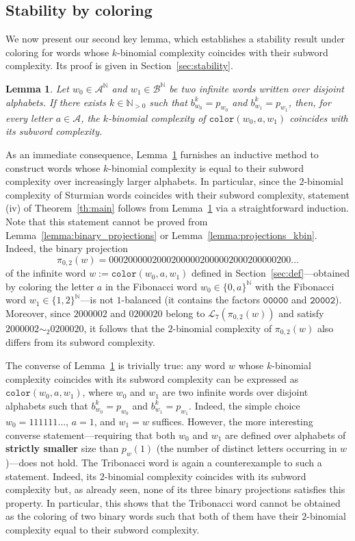 \documentclass{template_arxiv}
\newtheorem{lemma}{Lemma}%
\theoremstyle{definition}
\newcommand{\N}{\mathbb{N}}
\newcommand{\A}{\mathcal{A}}
\newcommand{\B}{\mathcal{B}}
\newcommand{\lan}{\mathcal{L}}
\newcommand{\colour}{\mathtt{color}}
\begin{document}
\subsection{Stability by coloring}

We now present our second key lemma, which establishes a stability result under coloring for words whose $k$-binomial complexity coincides with their subword complexity. Its proof is given in Section~\ref{sec:stability}.

\begin{lemma}\label{lemma:stability}
Let $w_0\in\A^\N$ and $w_1\in\B^\N$ be two infinite words written over disjoint alphabets. If there exists $k\in\N_{>0}$ such that $b_{w_0}^k=p_{w_0}$ and $b_{w_1}^k=p_{w_1}$, then, for every letter $a\in\A$, the $k$-binomial complexity of $\colour(w_0,a,w_1)$ coincides with its subword complexity.
\end{lemma}

As an immediate consequence, Lemma~\ref{lemma:stability} furnishes an inductive method to construct words whose $k$-binomial complexity is equal to their subword complexity over increasingly larger alphabets. In particular, since the $2$-binomial complexity of Sturmian words coincides with their subword complexity, statement (iv) of Theorem~\ref{th:main} follows from Lemma~\ref{lemma:stability} via a straightforward induction. Note that this statement cannot be proved from Lemma~\ref{lemma:binary_projections} or Lemma~\ref{lemma:projections_kbin}. Indeed, the binary projection
\[
	\pi_{0,2}(w)=00 02 00 00 02 00 02 00 00 02 00 00 02 00 02 00 00 02 00\ldots
\]
of the infinite word $w:=\colour(w_0,a,w_1)$ defined in Section~\ref{sec:def}---obtained by coloring the letter $a$ in the Fibonacci word $w_0\in\{0,a\}^\N$ with the Fibonacci word $w_1\in\{1,2\}^\N$---is not $1$-balanced (it contains the factors $\mathtt{00000}$ and $\mathtt{20002}$). Moreover, since $2000002$ and $0200020$ belong to $\lan_7(\pi_{0,2}(w))$ and satisfy $2000002\sim_2 0200020$, it follows that the $2$-binomial complexity of $\pi_{0,2}(w)$ also differs from its subword complexity.

The converse of Lemma~\ref{lemma:stability} is trivially true: any word $w$ whose $k$-binomial complexity coincides with its subword complexity can be expressed as $\colour(w_0,a,w_1)$, where $w_0$ and $w_1$ are two infinite words over disjoint alphabets such that $b_{w_0}^k=p_{w_0}$ and $b_{w_1}^k=p_{w_1}$. Indeed, the simple choice $w_0=111111\ldots$, $a=1$, and $w_1=w$ suffices. However, the more interesting converse statement---requiring that both $w_0$ and $w_1$ are defined over alphabets of \textbf{strictly smaller} size than $p_w(1)$ (the number of distinct letters occurring in $w$)---does not hold. The Tribonacci word is again a counterexample to such a statement. Indeed, its $2$-binomial complexity coincides with its subword complexity but, as already seen, none of its three binary projections satisfies this property. In particular, this shows that the Tribonacci word cannot be obtained as the coloring of two binary words such that both of them have their $2$-binomial complexity equal to their subword complexity.
\end{document}
